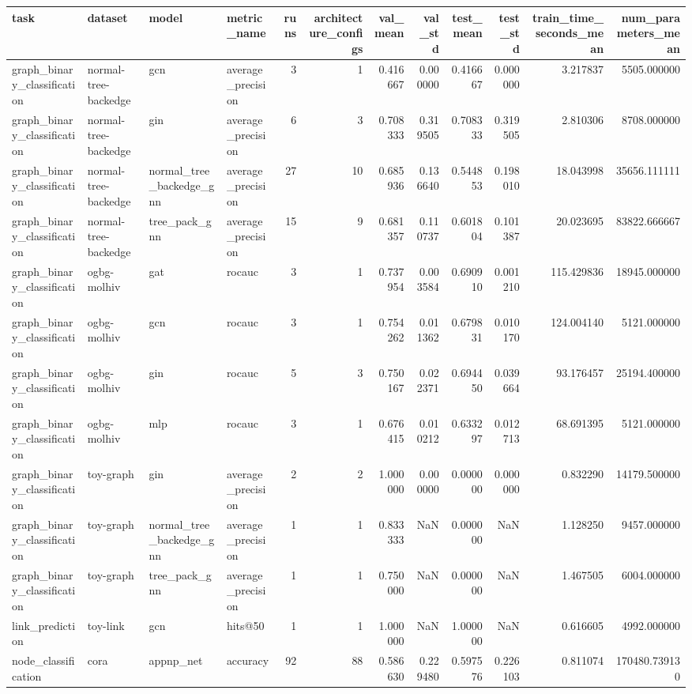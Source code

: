 \begin{tabular}{llllrrrrrrrr}
\toprule
task & dataset & model & metric_name & runs & architecture_configs & val_mean & val_std & test_mean & test_std & train_time_seconds_mean & num_parameters_mean \\
\midrule
graph_binary_classification & normal-tree-backedge & gcn & average_precision & 3 & 1 & 0.416667 & 0.000000 & 0.416667 & 0.000000 & 3.217837 & 5505.000000 \\
graph_binary_classification & normal-tree-backedge & gin & average_precision & 6 & 3 & 0.708333 & 0.319505 & 0.708333 & 0.319505 & 2.810306 & 8708.000000 \\
graph_binary_classification & normal-tree-backedge & normal_tree_backedge_gnn & average_precision & 27 & 10 & 0.685936 & 0.136640 & 0.544853 & 0.198010 & 18.043998 & 35656.111111 \\
graph_binary_classification & normal-tree-backedge & tree_pack_gnn & average_precision & 15 & 9 & 0.681357 & 0.110737 & 0.601804 & 0.101387 & 20.023695 & 83822.666667 \\
graph_binary_classification & ogbg-molhiv & gat & rocauc & 3 & 1 & 0.737954 & 0.003584 & 0.690910 & 0.001210 & 115.429836 & 18945.000000 \\
graph_binary_classification & ogbg-molhiv & gcn & rocauc & 3 & 1 & 0.754262 & 0.011362 & 0.679831 & 0.010170 & 124.004140 & 5121.000000 \\
graph_binary_classification & ogbg-molhiv & gin & rocauc & 5 & 3 & 0.750167 & 0.022371 & 0.694450 & 0.039664 & 93.176457 & 25194.400000 \\
graph_binary_classification & ogbg-molhiv & mlp & rocauc & 3 & 1 & 0.676415 & 0.010212 & 0.633297 & 0.012713 & 68.691395 & 5121.000000 \\
graph_binary_classification & toy-graph & gin & average_precision & 2 & 2 & 1.000000 & 0.000000 & 0.000000 & 0.000000 & 0.832290 & 14179.500000 \\
graph_binary_classification & toy-graph & normal_tree_backedge_gnn & average_precision & 1 & 1 & 0.833333 & NaN & 0.000000 & NaN & 1.128250 & 9457.000000 \\
graph_binary_classification & toy-graph & tree_pack_gnn & average_precision & 1 & 1 & 0.750000 & NaN & 0.000000 & NaN & 1.467505 & 6004.000000 \\
link_prediction & toy-link & gcn & hits@50 & 1 & 1 & 1.000000 & NaN & 1.000000 & NaN & 0.616605 & 4992.000000 \\
node_classification & cora & appnp_net & accuracy & 92 & 88 & 0.586630 & 0.229480 & 0.597576 & 0.226103 & 0.811074 & 170480.739130 \\

\end{tabular}
